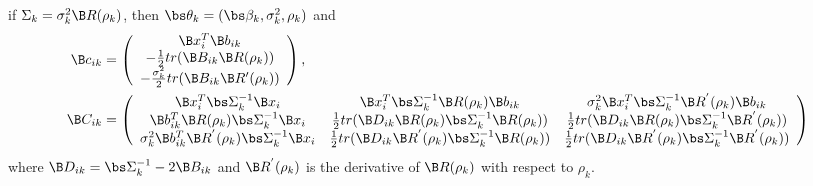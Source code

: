 \begin{theorem}
if $\Sigma_{k}=\sigma_{k}^{2}\B R(\rho_{k})$, then $\bs\theta_{k}=(\bs\beta_{k},\sigma^{2}_{k},\rho_{k})$ and
\begin{align*}
\B c_{ik}&=\left( \begin{array}{c}\B x_{i}^{T}\B b_{ik}\\ -\frac{1}{2}tr( \B B_{ik} \B R(\rho_{k}))\\ -\frac{\sigma^{2}_{k}}{2}tr( \B B_{ik} \B R'(\rho_{k}))\end{array}\right),\\
\B C_{ik}&=\left(\begin{array}{ccc} \B x_{i}^{T}\bs\Sigma_{k}^{-1}\B x_{i}& \B x_{i}^{T}\bs\Sigma_{k}^{-1}\B R(\rho_{k})\B b_{ik}&\sigma^{2}_{k}\B x_{i}^{T} \bs\Sigma^{-1}_{k}\B R^{'}(\rho_{k})\B b_{ik}\\  
\B b^{T}_{ik}\B R(\rho_{k})\bs\Sigma_{k}^{-1}\B x_{i}&\frac{1}{2}tr(\B D_{ik}\B R(\rho_{k})\bs\Sigma_{k}^{-1}\B R(\rho_{k}))&\frac{1}{2}tr(\B D_{ik}\B R(\rho_{k})\bs\Sigma_{k}^{-1}\B R^{'}(\rho_{k}))\\ 
\sigma^{2}_{k}\B b_{ik}^{T}\B R^{'}(\rho_{k}) \bs\Sigma^{-1}_{k}\B x_{i}&\frac{1}{2}tr(\B D_{ik}\B R^{'}(\rho_{k})\bs\Sigma_{k}^{-1}\B R(\rho_{k}))&\frac{1}{2}tr(\B D_{ik}\B R^{'}(\rho_{k})\bs\Sigma_{k}^{-1}\B R^{'}(\rho_{k}))
\end{array} \right)
\end{align*}
where $\B D_{ik} = \bs\Sigma_{k}^{-1}-2\B B_{ik}$ and $\B R^{'}(\rho_{k})$ is the derivative  of $\B R(\rho_{k})$ with respect to $\rho_{k}$. \\


\end{theorem}
